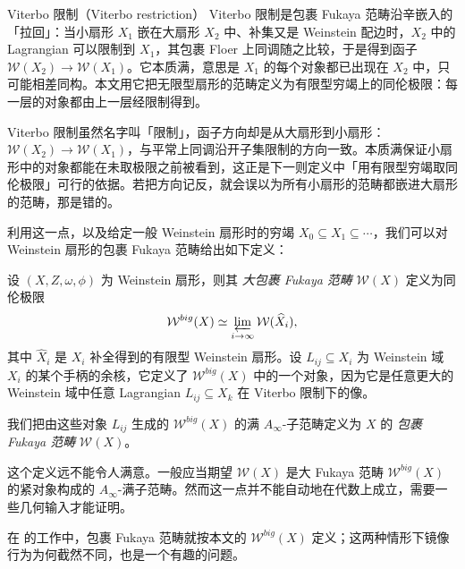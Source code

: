 \begin{conceptbox}{Viterbo 限制（Viterbo restriction）}
Viterbo 限制是包裹 Fukaya 范畴沿辛嵌入的「拉回」：当小扇形 $X_1$ 嵌在大扇形 $X_2$ 中、补集又是 Weinstein 配边时，$X_2$ 中的 Lagrangian 可以限制到 $X_1$，其包裹 Floer 上同调随之比较，于是得到函子 $\mathcal{W}(X_2)\to\mathcal{W}(X_1)$。它本质满，意思是 $X_1$ 的每个对象都已出现在 $X_2$ 中，只可能相差同构。本文用它把无限型扇形的范畴定义为有限型穷竭上的同伦极限：每一层的对象都由上一层经限制得到。
\par\smallskip{}
\end{conceptbox}

\begin{yizhu}[限制的方向]
Viterbo 限制虽然名字叫「限制」，函子方向却是从大扇形到小扇形：$\mathcal{W} (X_2)\to\mathcal{W} (X_1)$，与平常上同调沿开子集限制的方向一致。本质满保证小扇形中的对象都能在未取极限之前被看到，这正是下一则定义中「用有限型穷竭取同伦极限」可行的依据。若把方向记反，就会误以为所有小扇形的范畴都嵌进大扇形的范畴，那是错的。
\end{yizhu}

利用这一点，以及给定一般 Weinstein 扇形时的穷竭 $X_0\subseteq X_1\subseteq\dotsb$，我们可以对 Weinstein 扇形的包裹 Fukaya 范畴给出如下定义：

\begin{dfn}\label{defn:wrapped-Fukaya-cat-inf-sectors}
    设 $(X,Z,\omega,\phi)$ 为 Weinstein 扇形，则其 \emph{大包裹 Fukaya 范畴} $\mathcal{W} (X)$ 定义为同伦极限
\[
        \mathcal{W}^{big} (X)\simeq\varprojlim_{i\to\infty}\mathcal{W} (\widehat{X}_i),
    \]
    其中 $\widehat{X}_i$ 是 $X_i$ 补全得到的有限型 Weinstein 扇形。设 $L_{ij}\subseteq X_i$ 为 Weinstein 域 $X_i$ 的某个手柄的余核，它定义了 $\mathcal{W}^{big} (X)$ 中的一个对象，因为它是任意更大的 Weinstein 域中任意 Lagrangian $L_{ij}\subseteq X_k$ 在 Viterbo 限制下的像。\par
    我们把由这些对象 $L_{ij}$ 生成的 $\mathcal{W}^{big} (X)$ 的满 $A_{\infty}$-子范畴定义为 $X$ 的 \emph{包裹 Fukaya 范畴} $\mathcal{W} (X)$。
\end{dfn}

\begin{rmk}
    这个定义远不能令人满意。一般应当期望 $\mathcal{W} (X)$ 是大 Fukaya 范畴 $\mathcal{W}^{big} (X)$ 的紧对象构成的 $A_{\infty}$-满子范畴。然而这一点并不能自动地在代数上成立，需要一些几何输入才能证明。\par
    在 \cite{KW25} 的工作中，包裹 Fukaya 范畴就按本文的 $\mathcal{W}^{big} (X)$ 定义；这两种情形下镜像行为为何截然不同，也是一个有趣的问题。
\end{rmk}

